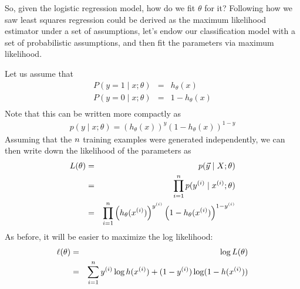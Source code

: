 \documentclass{article}
\begin{document}
So, given the logistic regression model, how do we fit $\theta$ for it?  Following how
we saw least squares regression could be derived as the maximum likelihood estimator
under a set of assumptions,
let's endow our classification model with a set of probabilistic assumptions,
and then fit the parameters via maximum likelihood.

Let us assume that
\begin{eqnarray*}
P(y=1 \mid x; \theta) &=& h_\theta(x) \\
P(y=0 \mid x; \theta) &=& 1- h_\theta(x) \\
\end{eqnarray*}
Note that this can be written more compactly as
\begin{eqnarray*}
p(y \mid x; \theta) = \left(h_\theta(x)\right)^y \left(1-h_\theta(x)\right)^{1-y}
\end{eqnarray*}
Assuming that the ${n}$ training examples were generated independently, we can then
write down the likelihood of the parameters as
\begin{eqnarray*}
L(\theta) &=& p({\vec{y}} \mid X ; \theta) \\
&=& \prod_{i=1}^{n} p({y^{(i)}}\mid {x^{(i)}};\theta) \\
&=& \prod_{i=1}^{n} \left(h_\theta({x^{(i)}})\right)^{y^{(i)}} \left(1-h_\theta({x^{(i)}})\right)^{1-{y^{(i)}}}
\end{eqnarray*}
As before, it will be easier to maximize the log likelihood:
\begin{eqnarray*}
\ell(\theta) &=& \log L(\theta) \\
&=& \sum_{i=1}^{n} {y^{(i)}} \log h({x^{(i)}}) + (1-{y^{(i)}}) \log(1- h({x^{(i)}}))
\end{eqnarray*}
\end{document}
